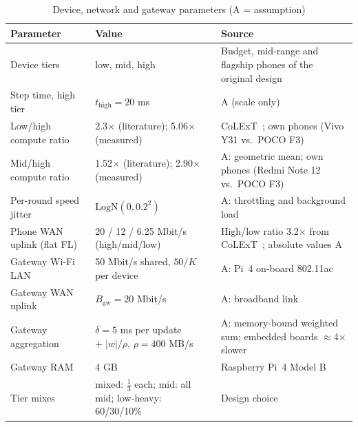 \documentclass[conference]{IEEEtran}
\newcommand{\wsize}{|w|}
\begin{document}
\begin{table}[t]
\centering
\caption{Device, network and gateway parameters (A = assumption)}
\label{tab:params}
\footnotesize
\renewcommand{\arraystretch}{1.1}
\begin{tabularx}{\columnwidth}{@{}p{2.45cm}p{2.25cm}Y@{}}
\toprule
\textbf{Parameter} & \textbf{Value} & \textbf{Source} \\
\midrule
Device tiers & low, mid, high & Budget, mid-range and flagship phones of the original design \\
Step time, high tier & $t_{\mathrm{high}} = 20$ ms & A (scale only) \\
Low/high compute ratio & 2.3$\times$ (literature); 5.06$\times$ (measured) & CoLExT~\cite{bozic2024}; own phones (Vivo Y31 vs.\ POCO F3) \\
Mid/high compute ratio & 1.52$\times$ (literature); 2.90$\times$ (measured) & A: geometric mean; own phones (Redmi Note 12 vs.\ POCO F3) \\
Per-round speed jitter & $\mathrm{LogN}(0, 0.2^2)$ & A: throttling and background load \\
Phone WAN uplink (flat FL) & 20 / 12 / 6.25 Mbit/s (high/mid/low) & High/low ratio 3.2$\times$ from CoLExT~\cite{bozic2024}; absolute values A \\
Gateway Wi-Fi LAN & 50 Mbit/s shared, $50/K$ per device & A: Pi~4 on-board 802.11ac \\
Gateway WAN uplink & $B_{\mathrm{gw}} = 20$ Mbit/s & A: broadband link \\
Gateway aggregation & $\delta = 5$ ms per update $+\;\wsize/\rho$, $\rho = 400$ MB/s & A: memory-bound weighted sum; embedded boards $\approx$4$\times$ slower~\cite{woisetschlager2024} \\
Gateway RAM & 4 GB & Raspberry Pi~4 Model B~\cite{rpi4brief} \\
Tier mixes & mixed: $\frac13$ each; mid: all mid; low-heavy: 60/30/10\% & Design choice \\
\bottomrule
\end{tabularx}
\end{table}
\end{document}
